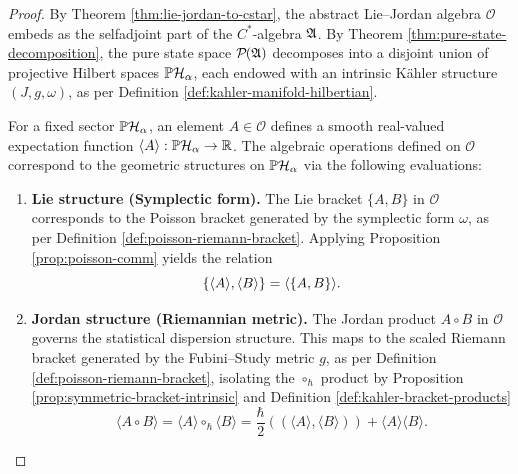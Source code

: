 \begin{proof}
	By Theorem \ref{thm:lie-jordan-to-cstar}, the abstract Lie--Jordan algebra $\mathcal{O}$ embeds  as the selfadjoint part of the $C^*$-algebra $\mathfrak{A}$. By Theorem \ref{thm:pure-state-decomposition}, the pure state space $\mathcal{P}(\A)$ decomposes into a disjoint union of projective Hilbert spaces $\PH_\alpha$, each endowed with an intrinsic Kähler structure $(J, g, \omega)$, as per Definition \ref{def:kahler-manifold-hilbertian}. 
	
	For a fixed sector $\PH_\alpha$, an element $A \in \mathcal{O}$ defines a smooth real-valued expectation function $\langle A \rangle : \PH_\alpha \to \R$. The algebraic operations defined on $\mathcal{O}$ correspond to the geometric structures on $\PH_\alpha$ via the following evaluations:
	
	\begin{enumerate}
		\item \textbf{Lie structure (Symplectic form).}
		The Lie bracket $\{A,B\}$ in $\mathcal{O}$ corresponds to the Poisson bracket generated by the symplectic form $\omega$, as per Definition \ref{def:poisson-riemann-bracket}. Applying Proposition \ref{prop:poisson-comm} yields the relation
		\begin{equation}
			\{\langle A\rangle,\langle B\rangle\} = \langle \{A,B\} \rangle.
		\end{equation} 
		
		\item \textbf{Jordan structure (Riemannian metric).}
		The Jordan product $A \circ B$ in $\mathcal{O}$ governs the statistical dispersion structure. This maps to the scaled Riemann bracket generated by the Fubini--Study metric $g$, as per Definition \ref{def:poisson-riemann-bracket}, isolating the $\circ_{\hbar}$ product by Proposition \ref{prop:symmetric-bracket-intrinsic} and Definition \ref{def:kahler-bracket-products}
		\begin{equation}
			\langle A \circ B \rangle = \langle A \rangle \circ_{\hbar} \langle B \rangle = \frac{\hbar}{2}((\langle A \rangle, \langle B \rangle)) + \langle A \rangle \langle B \rangle.
		\end{equation} 
		

\end{enumerate}
\end{proof}
